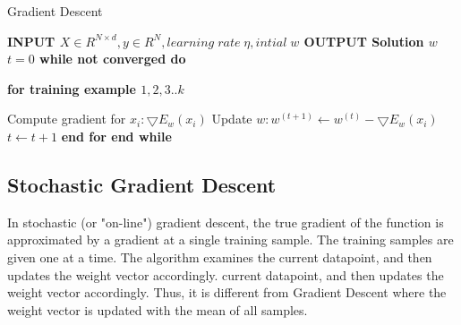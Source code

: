 \documentclass{sigplanconf}
\newlength\myindent
\newcommand\bindent{%
  \begingroup
  \setlength{\itemindent}{\myindent}
  \addtolength{\algorithmicindent}{\myindent}
}
\newcommand\eindent{\endgroup}
\newlength\mysecindent
\newcommand\quadindent{%
  \begingroup
  \setlength{\itemindent}{\mysecindent}
  \addtolength{\algorithmicindent}{\mysecindent}
}
\newcommand\quadeindent{\endgroup}
\begin{document}
\begin{algorithm}
\caption{	Gradient Descent}
\begin{algorithmic} 

\STATE \bf{INPUT} \begin{math} X \in {R}^{N \times  d}, y \in R^N, learning\;  rate\;  \eta, intial\; w \end{math} 
\STATE \bf{OUTPUT} \textnormal{Solution} \begin{math}  w \end{math} 
	\STATE \textnormal{\begin{math} t = 0\end{math} }
	\STATE \bf{while} \textnormal{not converged} \bf{do}
    	\bindent
		 \STATE \bf{for} \textnormal{\indent training example \begin{math}1,2,3..k\end{math}}
		\quadindent
			 \STATE \textnormal{\indent Compute gradient for \begin{math}x_i: \bigtriangledown{E_w(x_i)}\end{math}}
			 \STATE \textnormal{\indent Update \begin{math}w: w^{(t+1)} \gets w^{(t)} - \bigtriangledown{E_w(x_i)}\end{math}}
			 \STATE \textnormal{\indent \begin{math}t \gets t + 1\end{math}}
		\quadeindent
	 \STATE \bf{end for}
	 \eindent
\STATE \bf{end while}

\end{algorithmic}
\end{algorithm}


\subsection{Stochastic Gradient Descent}
In stochastic (or "on-line") gradient descent, the true gradient of the function is approximated by a gradient at a
single training sample. The training samples are given one at a time. The algorithm examines the
current datapoint, and then updates the weight vector accordingly.
current datapoint, and then updates the weight vector accordingly. Thus, it is different from Gradient Descent where the weight
vector is updated with the mean of all samples.
\end{document}
